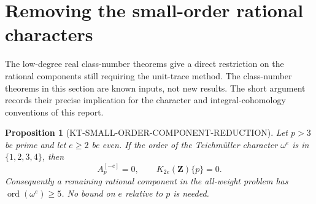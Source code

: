 \documentclass[11pt,a4paper]{article}
\newtheorem{proposition}[theorem]{Proposition}
\theoremstyle{definition}
\begin{document}


\section{Removing the small-order rational characters}
\label{sec:kt-small-character-order}

The low-degree real class-number theorems give a direct restriction
on the rational components still requiring the unit-trace method.
The class-number theorems in this section are known inputs, not new
results. The short argument records their precise implication for
the character and integral-cohomology conventions of this report.

\begin{proposition}[KT-SMALL-ORDER-COMPONENT-REDUCTION]
Let $p>3$ be prime and let $e\ge2$ be even. If the order of the
Teichm\"uller character $\omega^e$ is in $\{1,2,3,4\}$, then
\[
                 A_p^{[-e]}=0,
                 \qquad K_{2e}(\mathbf Z)\{p\}=0.       \tag{LO.1}
\]
Consequently a remaining rational component in the all-weight
problem has $\operatorname{ord}(\omega^e)\ge5$.
No bound on $e$ relative to $p$ is needed.
\end{proposition}
\end{document}

